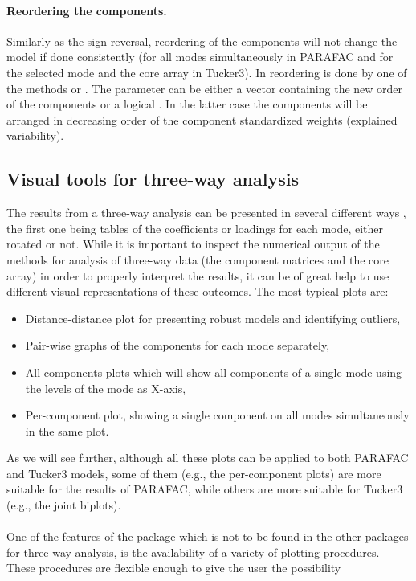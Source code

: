 \documentclass[article,shortnames, nojss]{jss}
\newcommand{\bi}{\begin{itemize}}
\newcommand{\ei}{\end{itemize}}
\begin{document}
\paragraph{Reordering the components.} Similarly as the sign reversal,
reordering of the components will not change the model if done consistently
(for all modes simultaneously in PARAFAC and for the selected mode
and the core array in Tucker3). In  reordering
is done by one of the methods  or .
The parameter  can be either a vector containing the new order
of the components or a logical . In the latter case the
components will be arranged in decreasing order of the component
standardized weights (explained variability).
\subsection{Visual tools for three-way analysis}
\label{sec:visual}
The results from a three-way analysis can be presented in
several different ways \citep[see][]{kroonenberg:2009}, the first one
being tables of the coefficients or loadings for each mode, either rotated or not.
While it is important to inspect the numerical output of the
methods for analysis of three-way data (the component matrices
and the core array) in order to properly interpret the results,
it can be of great help to use different visual representations of these outcomes.
The most typical plots are:
\bi
\item Distance-distance plot for presenting robust models and identifying outliers,
\item Pair-wise graphs of the components for each mode separately,
\item All-components plots which will show all components of a single mode using the levels of the mode as X-axis,
\item Per-component plot, showing a single component on
all modes simultaneously in the same plot.
\ei
As we will see further, although all these plots can be applied
to both PARAFAC and Tucker3 models, some of them (e.g., the
per-component plots) are more suitable for the results of
PARAFAC, while others are more suitable for Tucker3 (e.g., the joint biplots).\\\\
One of the features of the package  which is not
to be found in the other  packages for three-way analysis,
is the availability of a variety of plotting procedures. These
procedures are flexible enough to give the user the possibility
\end{document}

